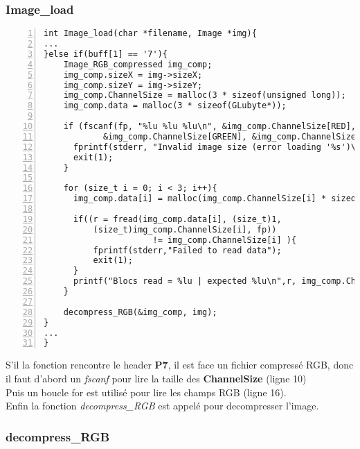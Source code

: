\documentclass[12pt, letterpaper]{article}
\begin{document}
\subsubsection{Image\_load}
\begin{Verbatim}[numbers=left,xleftmargin = 5mm]
int Image_load(char *filename, Image *img){
...
}else if(buff[1] == '7'){
    Image_RGB_compressed img_comp;
    img_comp.sizeX = img->sizeX;
    img_comp.sizeY = img->sizeY;
    img_comp.ChannelSize = malloc(3 * sizeof(unsigned long));
    img_comp.data = malloc(3 * sizeof(GLubyte*));

    if (fscanf(fp, "%lu %lu %lu\n", &img_comp.ChannelSize[RED], 
            &img_comp.ChannelSize[GREEN], &img_comp.ChannelSize[BLUE]) != 3){
      fprintf(stderr, "Invalid image size (error loading '%s')\n", filename);
      exit(1);
    }
    
    for (size_t i = 0; i < 3; i++){
      img_comp.data[i] = malloc(img_comp.ChannelSize[i] * sizeof(GLubyte));

      if((r = fread(img_comp.data[i], (size_t)1, 
          (size_t)img_comp.ChannelSize[i], fp)) 
                      != img_comp.ChannelSize[i] ){
          fprintf(stderr,"Failed to read data");
          exit(1);
      }
      printf("Blocs read = %lu | expected %lu\n",r, img_comp.ChannelSize[i]);
    }
    
    decompress_RGB(&img_comp, img);
}
...
}
\end{Verbatim}
S'il la fonction rencontre le header \textbf{P7}, il est face un fichier compressé RGB, donc il faut d'abord
un \textit{fscanf} pour lire la taille des \textbf{ChannelSize} (ligne 10)\\
Puis un boucle for est utilisé pour lire les champs RGB (ligne 16).\\
Enfin la fonction \textit{decompress\_RGB} est appelé pour decompresser l'image.

\subsubsection{decompress\_RGB}
\begin{Verbatim}[numbers=left,xleftmargin = 5mm]

\end{Verbatim}

 
\end{document}
